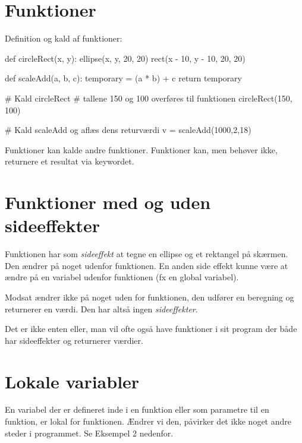 \documentclass{../../handout}
\begin{document}
\chapter{Funktioner}
\noindent
Definition og kald af funktioner:
\begin{python}
def circleRect(x, y):
    ellipse(x, y, 20, 20)
    rect(x - 10, y - 10, 20, 20)

def scaleAdd(a, b, c):
    temporary = (a * b) + c
    return temporary

# Kald circleRect
# tallene 150 og 100 overføres til funktionen
circleRect(150, 100)

# Kald scaleAdd og aflæs dens returværdi
v = scaleAdd(1000,2,18)
\end{python}
Funktioner kan kalde andre funktioner. Funktioner kan, men behøver
ikke, returnere et resultat via  keywordet.

\newpage
\chapter{Funktioner med og uden sideeffekter}
Funktionen  har som \textit{sideeffekt} at tegne en
ellipse og et rektangel på skærmen. Den ændrer på noget udenfor
funktionen. En anden side effekt kunne være at ændre på en variabel
udenfor funktionen (fx en global variabel).

Modsat ændrer  ikke på noget uden for funktionen, den
udfører en beregning og returnerer en værdi. Den har altså ingen
\textit{sideeffekter}.

Det er ikke enten eller, man vil ofte også have funktioner i sit
program der både har sideeffekter og returnerer værdier.


\chapter{Lokale variabler}
En variabel der er defineret inde i en funktion eller som parametre
til en funktion, er lokal for funktionen. Ændrer vi den, påvirker det
ikke noget andre steder i programmet. Se Eksempel 2 nedenfor.


\end{document}

